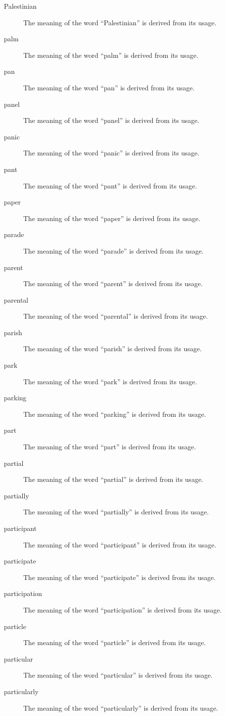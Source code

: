 \documentclass[12pt, letterpaper]{memoir}
\begin{document}
\begin{description}
\item[Palestinian] The meaning of the word ``Palestinian'' is derived from its usage.
\item[palm] The meaning of the word ``palm'' is derived from its usage.
\item[pan] The meaning of the word ``pan'' is derived from its usage.
\item[panel] The meaning of the word ``panel'' is derived from its usage.
\item[panic] The meaning of the word ``panic'' is derived from its usage.
\item[pant] The meaning of the word ``pant'' is derived from its usage.
\item[paper] The meaning of the word ``paper'' is derived from its usage.
\item[parade] The meaning of the word ``parade'' is derived from its usage.
\item[parent] The meaning of the word ``parent'' is derived from its usage.
\item[parental] The meaning of the word ``parental'' is derived from its usage.
\item[parish] The meaning of the word ``parish'' is derived from its usage.
\item[park] The meaning of the word ``park'' is derived from its usage.
\item[parking] The meaning of the word ``parking'' is derived from its usage.
\item[part] The meaning of the word ``part'' is derived from its usage.
\item[partial] The meaning of the word ``partial'' is derived from its usage.
\item[partially] The meaning of the word ``partially'' is derived from its usage.
\item[participant] The meaning of the word ``participant'' is derived from its usage.
\item[participate] The meaning of the word ``participate'' is derived from its usage.
\item[participation] The meaning of the word ``participation'' is derived from its usage.
\item[particle] The meaning of the word ``particle'' is derived from its usage.
\item[particular] The meaning of the word ``particular'' is derived from its usage.
\item[particularly] The meaning of the word ``particularly'' is derived from its usage.

\end{description}
\end{document}
